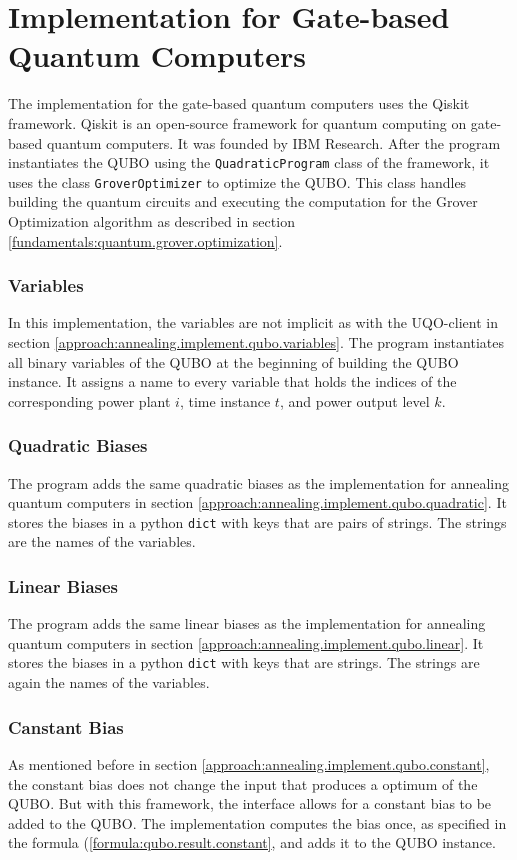 \section{Implementation for Gate-based Quantum Computers}
\label{approach:gate.implement}

The implementation for the gate-based quantum computers uses the Qiskit framework.
Qiskit is an open-source framework for quantum computing on gate-based quantum computers.
It was founded by IBM Research.
\cite{QiskitWeb, QiskitGitHub}
After the program instantiates the QUBO using the \texttt{QuadraticProgram} class of the framework, it uses the class \texttt{GroverOptimizer} to optimize the QUBO.
This class handles building the quantum circuits and executing the computation for the Grover Optimization algorithm as described in section \ref{fundamentals:quantum.grover.optimization}.

\subsubsection{Variables}

In this implementation, the variables are not implicit as with the UQO-client in section \ref{approach:annealing.implement.qubo.variables}.
The program instantiates all binary variables of the QUBO at the beginning of building the QUBO instance.
It assigns a name to every variable that holds the indices of the corresponding power plant $i$, time instance $t$, and power output level $k$.

\subsubsection{Quadratic Biases}

The program adds the same quadratic biases as the implementation for annealing quantum computers in section \ref{approach:annealing.implement.qubo.quadratic}.
It stores the biases in a python \texttt{dict} with keys that are pairs of strings.
The strings are the names of the variables.

\subsubsection{Linear Biases}

The program adds the same linear biases as the implementation for annealing quantum computers in section \ref{approach:annealing.implement.qubo.linear}.
It stores the biases in a python \texttt{dict} with keys that are strings.
The strings are again the names of the variables.

\subsubsection{Canstant Bias}

As mentioned before in section \ref{approach:annealing.implement.qubo.constant}, the constant bias does not change the input that produces a optimum of the QUBO.
But with this framework, the interface allows for a constant bias to be added to the QUBO.
The implementation computes the bias once, as specified in the formula (\ref{formula:qubo.result.constant}, and adds it to the QUBO instance.
